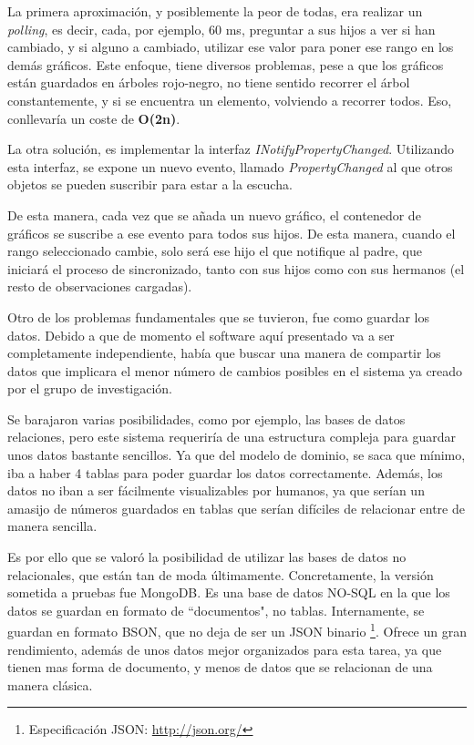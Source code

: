 La primera aproximaci\'on, y posiblemente la peor de todas, era realizar un \emph{polling}, es decir, cada, por ejemplo, 60 ms,
preguntar a sus hijos a ver si han cambiado, y si alguno a cambiado, utilizar ese valor para poner ese rango en los dem\'as 
gr\'aficos. Este enfoque, tiene diversos problemas, pese a que los gr\'aficos est\'an guardados en \'arboles rojo-negro,
no tiene sentido recorrer el \'arbol constantemente, y si se encuentra un elemento, volviendo a recorrer todos. Eso,
conllevar\'ia un coste de \textbf{O(2n)}.

La otra soluci\'on, es implementar la interfaz \emph{INotifyPropertyChanged}. Utilizando esta interfaz, se expone un 
nuevo evento, llamado \emph{PropertyChanged} al que otros objetos se pueden suscribir para estar a la escucha.

De esta manera, cada vez que se a\~nada un nuevo gr\'afico, el contenedor de gr\'aficos se suscribe a ese evento para todos
sus hijos. De esta manera, cuando el rango seleccionado cambie, solo ser\'a ese hijo el que notifique al padre, que iniciar\'a
el proceso de sincronizado, tanto con sus hijos como con sus hermanos (el resto de observaciones cargadas).

Otro de los problemas fundamentales que se tuvieron, fue como guardar los datos. Debido a que de momento el software
aqu\'i presentado va a ser completamente independiente, hab\'ia que buscar una manera de compartir los datos
que implicara el menor n\'umero de cambios posibles en el sistema ya creado por el grupo de investigaci\'on.

Se barajaron varias posibilidades, como por ejemplo, las bases de datos relaciones, pero este sistema requerir\'ia
de una estructura compleja para guardar unos datos bastante sencillos. Ya que del modelo de dominio, se saca que m\'inimo,
iba a haber 4 tablas para poder guardar los datos correctamente. Adem\'as, los datos no iban a ser f\'acilmente 
visualizables por humanos, ya que ser\'ian un amasijo de n\'umeros guardados en tablas que ser\'ian dif\'iciles de
relacionar entre de manera sencilla.

Es por ello que se valor\'o la posibilidad de utilizar las bases de datos no relacionales, que est\'an tan de moda
\'ultimamente. Concretamente, la versi\'on sometida a pruebas fue MongoDB. Es una base de datos NO-SQL en la que los
datos se guardan en formato de ``documentos", no tablas. Internamente, se guardan en formato BSON, que no deja de ser
un JSON binario \footnote{Especificaci\'{o}n JSON: \url{http://json.org/}}. Ofrece un gran rendimiento, adem\'as
de unos datos mejor organizados para esta tarea, ya que tienen mas forma de documento, y menos de datos que se
relacionan de una manera cl\'asica. 

